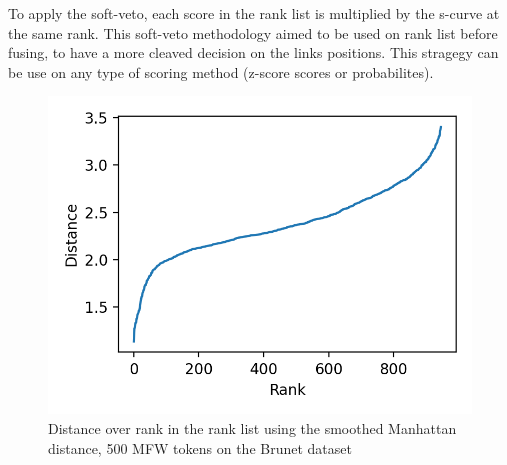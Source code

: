 To apply the soft-veto, each score in the rank list is multiplied by the s-curve at the same rank.
This soft-veto methodology aimed to be used on rank list before fusing, to have a more cleaved decision on the links positions.
This stragegy can be use on any type of scoring method (z-score scores or probabilites).

\begin{figure}
  \centering
  \caption{Distance over rank in the rank list using the smoothed Manhattan distance, 500 MFW tokens on the Brunet dataset}
  \label{fig:distance_over_rank}
  \includegraphics[width=\linewidth]{img/distance_over_rank.png}
\end{figure}

